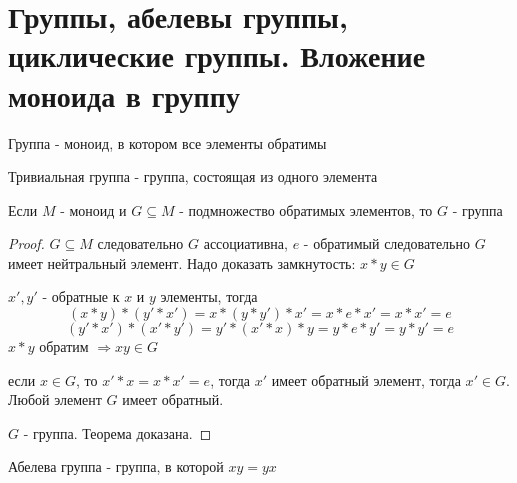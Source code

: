 \documentclass[../main/document.tex]{subfiles}
\begin{document}
\section{Группы, абелевы группы, циклические группы. Вложение моноида в группу}
\begin{dfn}[Группа]
Группа - моноид, в котором все элементы обратимы
\end{dfn}
\begin{dfn}
Тривиальная группа - группа, состоящая из одного элемента
\end{dfn}
\begin{thm}
Если $M$ - моноид и $G\subseteq M$ - подмножество обратимых элементов, то $G$ - группа
\begin{proof}

$G\subseteq M$ следовательно $G$ ассоциативна, 
$e$ - обратимый следовательно $G$ имеет нейтральный элемент. 
Надо доказать замкнутость: $x*y\in G$

$x',y'$ - обратные к $x$ и $y$ элементы, тогда
$$(x*y)*(y'*x')=x*(y*y')*x'=x*e*x'=x*x'=e$$
$$(y'*x')*(x'*y')=y'*(x'*x)*y=y*e*y'=y*y'=e$$
$x*y$ обратим $\Rightarrow xy\in G$

если $x\in G$, то $x'*x=x*x'=e$, тогда $x'$  имеет обратный элемент, тогда $x'\in G$. Любой элемент $G$ имеет обратный.

$G$ - группа. Теорема доказана.

\end{proof}
\end{thm}
\begin{dfn}
Абелева группа - группа, в которой $xy=yx$
\end{dfn}
\begin{dfn}
\end{dfn}
\end{document}
